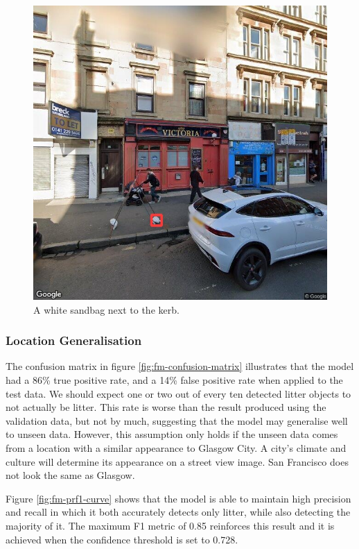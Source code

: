 \documentclass{thesis}
\begin{document}
\begin{figure}[h!]
    \centering
    \includegraphics[scale=0.45]{images/flaw-sandbag.jpg}
    \caption{A white sandbag next to the kerb.}
    \label{fig:sandbag}
\end{figure}

\subsubsection{Location Generalisation}

The confusion matrix in figure \ref{fig:fm-confusion-matrix} illustrates that the model had a 86\% true positive rate, and a 14\% false positive rate when applied to the test data. We should expect one or two out of every ten detected litter objects to not actually be litter. This rate is worse than the result produced using the validation data, but not by much, suggesting that the model may generalise well to unseen data. However, this assumption only holds if the unseen data comes from a location with a similar appearance to Glasgow City. A city's climate and culture will determine its appearance on a street view image. San Francisco does not look the same as Glasgow.

Figure \ref{fig:fm-prf1-curve} shows that the model is able to maintain high precision and recall in which it both accurately detects only litter, while also detecting the majority of it. The maximum F1 metric of 0.85 reinforces this result and it is achieved when the confidence threshold is set to 0.728.
\end{document}
